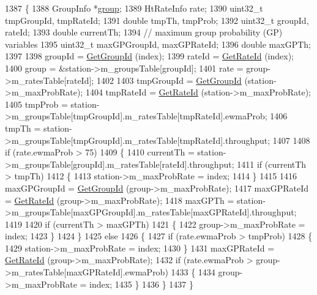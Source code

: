 \begin{DoxyCode}
1387 \{
1388   GroupInfo *\hyperlink{namespacevisualizer_1_1higcontainer_aa6ad2b76790275bfce7783429beaa23f}{group};
1389   HtRateInfo rate;
1390   uint32\_t tmpGroupId, tmpRateId;
1391   \textcolor{keywordtype}{double} tmpTh, tmpProb;
1392   uint32\_t groupId, rateId;
1393   \textcolor{keywordtype}{double} currentTh;
1394   \textcolor{comment}{// maximum group probability (GP) variables}
1395   uint32\_t maxGPGroupId, maxGPRateId;
1396   \textcolor{keywordtype}{double} maxGPTh;
1397 
1398   groupId = \hyperlink{classns3_1_1MinstrelHtWifiManager_a43157e6007b4b922043cb02a99ea6d1f}{GetGroupId} (index);
1399   rateId = \hyperlink{classns3_1_1MinstrelHtWifiManager_a6162341f1348bbe713d09642b09ac658}{GetRateId} (index);
1400   group = &station->m\_groupsTable[groupId];
1401   rate = group->m\_ratesTable[rateId];
1402 
1403   tmpGroupId = \hyperlink{classns3_1_1MinstrelHtWifiManager_a43157e6007b4b922043cb02a99ea6d1f}{GetGroupId} (station->m\_maxProbRate);
1404   tmpRateId = \hyperlink{classns3_1_1MinstrelHtWifiManager_a6162341f1348bbe713d09642b09ac658}{GetRateId} (station->m\_maxProbRate);
1405   tmpProb = station->m\_groupsTable[tmpGroupId].m\_ratesTable[tmpRateId].ewmaProb;
1406   tmpTh =  station->m\_groupsTable[tmpGroupId].m\_ratesTable[tmpRateId].throughput;
1407 
1408   \textcolor{keywordflow}{if} (rate.ewmaProb > 75)
1409     \{
1410       currentTh = station->m\_groupsTable[groupId].m\_ratesTable[rateId].throughput;
1411       \textcolor{keywordflow}{if} (currentTh > tmpTh)
1412         \{
1413           station->m\_maxProbRate = index;
1414         \}
1415 
1416       maxGPGroupId = \hyperlink{classns3_1_1MinstrelHtWifiManager_a43157e6007b4b922043cb02a99ea6d1f}{GetGroupId} (group->m\_maxProbRate);
1417       maxGPRateId = \hyperlink{classns3_1_1MinstrelHtWifiManager_a6162341f1348bbe713d09642b09ac658}{GetRateId} (group->m\_maxProbRate);
1418       maxGPTh = station->m\_groupsTable[maxGPGroupId].m\_ratesTable[maxGPRateId].throughput;
1419 
1420       \textcolor{keywordflow}{if} (currentTh > maxGPTh)
1421         \{
1422           group->m\_maxProbRate = index;
1423         \}
1424     \}
1425   \textcolor{keywordflow}{else}
1426     \{
1427       \textcolor{keywordflow}{if} (rate.ewmaProb > tmpProb)
1428         \{
1429           station->m\_maxProbRate = index;
1430         \}
1431       maxGPRateId = \hyperlink{classns3_1_1MinstrelHtWifiManager_a6162341f1348bbe713d09642b09ac658}{GetRateId} (group->m\_maxProbRate);
1432       \textcolor{keywordflow}{if} (rate.ewmaProb > group->m\_ratesTable[maxGPRateId].ewmaProb)
1433         \{
1434           group->m\_maxProbRate = index;
1435         \}
1436     \}
1437 \}
\end{DoxyCode}


